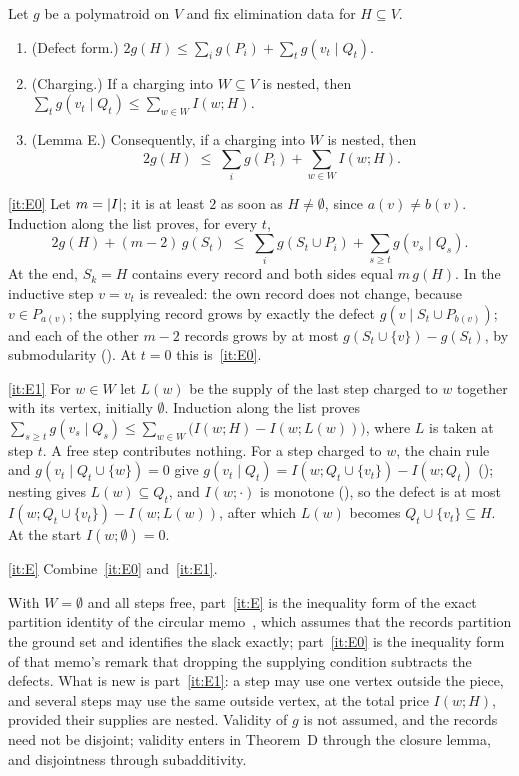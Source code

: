 \begin{lemma}\label{lem:E}
Let $g$ be a polymatroid on $V$ and fix elimination data for $H\subseteq V$.
\begin{enumerate}[label=(\alph*)]
\item\label{it:E0} (Defect form.) $2g(H)\le\sum_ig(P_i)+\sum_tg(v_t\mid Q_t)$.
\item\label{it:E1} (Charging.) If a charging into $W\subseteq V$ is nested, then
$\sum_tg(v_t\mid Q_t)\le\sum_{w\in W}I(w;H)$.
\item\label{it:E} (Lemma E.) Consequently, if a charging into $W$ is nested, then
\[
  2g(H)\;\le\;\sum_ig(P_i)+\sum_{w\in W}I(w;H).
\]
\end{enumerate}
\end{lemma}

\begin{outline}
\ref{it:E0} Let $m=\lvert I \rvert$; it is at least $2$ as soon as $H\ne\emptyset$, since $a(v)\ne b(v)$. Induction along the
list proves, for every $t$,
\[
  2g(H)+(m-2)\,g(S_t)\;\le\;\sum_ig(S_t\cup P_i)+\sum_{s\ge t}g(v_s\mid Q_s).
\]
At the end, $S_k=H$ contains every record and both sides equal $m\,g(H)$. In the inductive step $v=v_t$ is revealed: the
own record does not change, because $v\in P_{a(v)}$; the supplying record grows by
exactly the defect $g(v\mid S_t\cup P_{b(v)})$; and each of the other $m-2$ records grows by at most
$g(S_t\cup\{v\})-g(S_t)$, by submodularity (). At $t=0$ this is~\ref{it:E0}.

\ref{it:E1} For $w\in W$ let $L(w)$ be the supply of the last step charged to $w$ together with its vertex, initially
$\emptyset$. Induction along the list proves
$\sum_{s\ge t}g(v_s\mid Q_s)\le\sum_{w\in W}\bigl(I(w;H)-I(w;L(w))\bigr)$, where $L$ is taken at step $t$. A free step
contributes nothing. For a step charged to $w$, the chain rule and $g(v_t\mid Q_t\cup\{w\})=0$ give
$g(v_t\mid Q_t)=I(w;Q_t\cup\{v_t\})-I(w;Q_t)$ (); nesting gives $L(w)\subseteq Q_t$, and
$I(w;\cdot)$ is monotone (), so the defect is at most $I(w;Q_t\cup\{v_t\})-I(w;L(w))$, after which
$L(w)$ becomes $Q_t\cup\{v_t\}\subseteq H$. At the start $I(w;\emptyset)=0$.

\ref{it:E} Combine~\ref{it:E0} and~\ref{it:E1}.
\end{outline}

With $W=\emptyset$ and all steps free, part~\ref{it:E} is the inequality form of the exact partition identity of the
circular memo~\cite[Theorem~2.1]{CircularMemo2026}, which assumes that the records partition the ground set and
identifies the slack exactly; part~\ref{it:E0} is the inequality form of that memo's remark that dropping the
supplying condition subtracts the defects. What is new is part~\ref{it:E1}: a step may use one vertex outside the
piece, and several steps may use the same outside vertex, at the total price $I(w;H)$, provided their supplies are
nested. Validity of $g$ is not assumed, and the records need not be disjoint; validity enters in Theorem~D through the
closure lemma, and disjointness through subadditivity.

